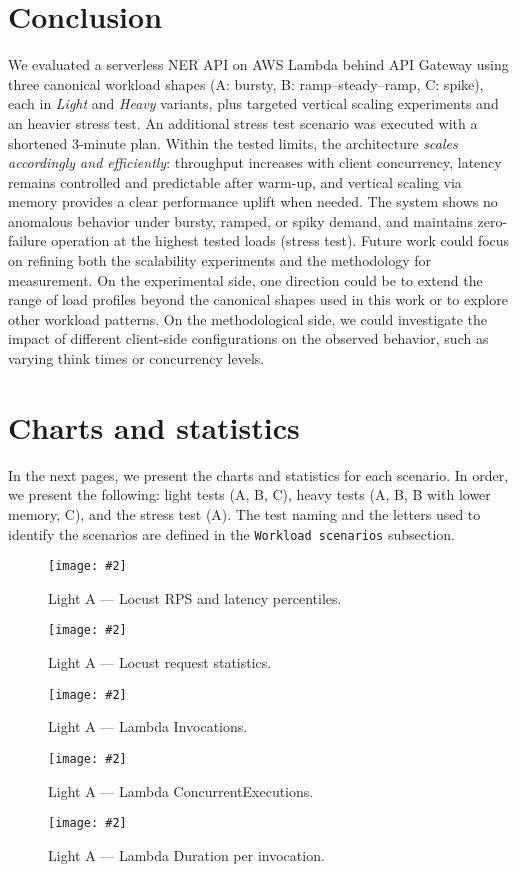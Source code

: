 \documentclass[11pt,a4paper]{article}
\newcommand{\scenariofig}[4][\linewidth]{%
  \begin{figure}[htbp]
    \centering
    \texttt{[image: \#2]}
    \caption{#3}
    \label{#4}
  \end{figure}%
}
\begin{document}
\section{Conclusion}\label{sec:conclusion}

We evaluated a serverless NER API on AWS Lambda behind API Gateway using three canonical workload shapes (A: bursty, B: ramp–steady–ramp, C: spike), each in \emph{Light} and \emph{Heavy} variants, plus targeted vertical scaling experiments and an heavier stress test. An additional stress test scenario was executed with a shortened 3-minute plan.
Within the tested limits, the architecture \emph{scales accordingly and efficiently}: throughput increases with client concurrency, latency remains controlled and predictable after warm-up, and vertical scaling via memory provides a clear performance uplift when needed. The system shows no anomalous behavior under bursty, ramped, or spiky demand, and maintains zero-failure operation at the highest tested loads (stress test).
Future work could focus on refining both the scalability experiments and the methodology for measurement. On the experimental side, one direction could be to extend the range of load profiles beyond the canonical shapes used in this work or to explore other workload patterns. On the methodological side, we could investigate the impact of different client-side configurations on the observed behavior, such as varying think times or concurrency levels.

\section{Charts and statistics}
In the next pages, we present the charts and statistics for each scenario. In order, we present the following: light tests (A, B, C), heavy tests (A, B, B with lower memory, C), and the stress test (A). The test naming and the letters used to identify the scenarios are defined in the \texttt{Workload scenarios} subsection.

\clearpage

\scenariofig[0.8\textwidth]{figures/lA - Charts.png}{Light A — Locust RPS and latency percentiles.}{fig:la-charts}
\scenariofig[0.9\textwidth]{figures/lA - Stats.png}{Light A — Locust request statistics.}{fig:la-stats}
\scenariofig{figures/lA - Invocations.png}{Light A — Lambda Invocations.}{fig:la-invocations}
\scenariofig[0.9\textwidth]{figures/lA - ConcExecutions.png}{Light A — Lambda ConcurrentExecutions.}{fig:la-conc}
\scenariofig{figures/lA - Duration.png}{Light A — Lambda Duration per invocation.}{fig:la-duration}
\end{document}
